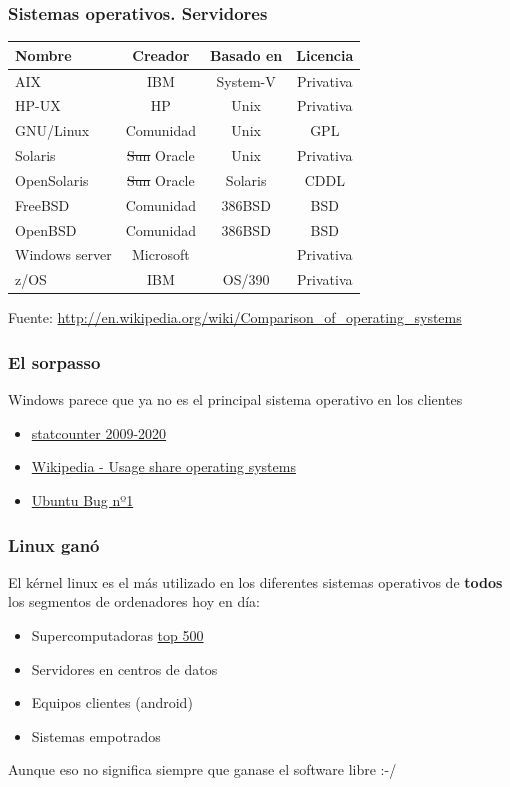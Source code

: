 \documentclass{beamer}
\begin{document}
\begin{frame} \frametitle{Sistemas operativos. Servidores}
  \begin{center}
    \begin{tabular}[center]{|l|ccc|}
      \hline
      Nombre & Creador & Basado en& Licencia\\
      \hline
      AIX & IBM & System-V & Privativa\\
      HP-UX & HP & Unix & Privativa\\
      GNU/Linux & Comunidad & Unix & GPL\\
      Solaris&\sout{Sun} Oracle& Unix & Privativa\\
      OpenSolaris & \sout{Sun} Oracle & Solaris & CDDL\\
      FreeBSD & Comunidad & 386BSD & BSD\\
      OpenBSD & Comunidad & 386BSD & BSD\\
      Windows server & Microsoft & & Privativa\\
      z/OS & IBM & OS/390 & Privativa\\
      \hline
    \end{tabular}
  \end{center}
\tiny{Fuente: \url{http://en.wikipedia.org/wiki/Comparison_of_operating_systems}}
\end{frame}

\begin{frame}
  \frametitle{El sorpasso}
 Windows parece que ya no es el principal sistema operativo en los clientes\par
 \begin{itemize}
  \item \href{http://gs.statcounter.com/os-market-share\#monthly-200901-202009}{statcounter 2009-2020}
 \item \href{https://en.wikipedia.org/wiki/Usage\_share\_of\_operating\_systems}{Wikipedia - Usage share operating systems}
 \item \href{https://bugs.launchpad.net/ubuntu/+bug/1}{Ubuntu Bug nº1}
 \end{itemize}
\end{frame}

\begin{frame}
  \frametitle{Linux ganó}
  El kérnel linux es el más utilizado en los diferentes sistemas
  operativos de \textbf{todos} los segmentos de ordenadores hoy en
  día:
  \begin{itemize}
  \item Supercomputadoras \href{https://www.top500.org/statistics/details/osfam/1}{top 500}
  \item Servidores en centros de datos
  \item Equipos clientes (android)
  \item Sistemas empotrados
  \end{itemize}
  Aunque eso no significa siempre que ganase el software libre :-/
\end{frame}
\end{document}
